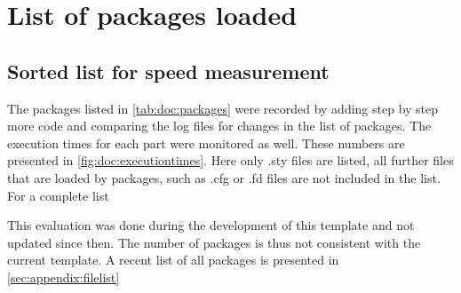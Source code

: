 
\chapter{List of packages loaded}

\section{Sorted list for speed measurement}
The packages listed in \cref{tab:doc:packages} were recorded by adding step by step more code and comparing the log files for changes in the list of packages. The execution times for each part were monitored as well. These numbers are presented in \cref{fig:doc:executiontimes}. Here only .sty files are listed, all further files that are loaded by packages, such as .cfg or .fd files are not included in the list. For a complete list 

This evaluation was done during the development of this template and not updated since then. 
The number of packages is thus not consistent with the current template. A recent list of all packages 
is presented in \cref{sec:appendix:filelist}

